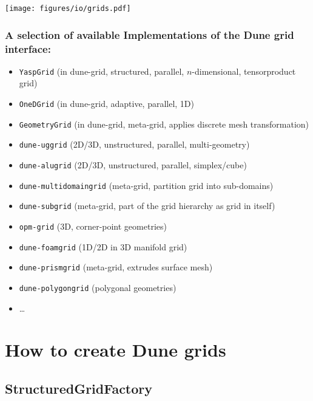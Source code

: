 \documentclass[ignorenonframetext,11pt]{beamer}
\theoremstyle{definition}
\begin{document}
\begin{frame}
 \texttt{[image: figures/io/grids.pdf]}
\end{frame}


\begin{frame}
  \frametitle{A selection of available Implementations of the Dune grid interface:}
  \begin{itemize}
  \item \lstinline!YaspGrid! (in dune-grid, structured, parallel, $n$-dimensional, tensorproduct grid)
  \item \lstinline!OneDGrid! (in dune-grid, adaptive, parallel, 1D)
  \item \lstinline!GeometryGrid! (in dune-grid, meta-grid, applies discrete mesh transformation)
  \item \lstinline!dune-uggrid! (2D/3D, unstructured, parallel, multi-geometry)
  \item \lstinline!dune-alugrid! (2D/3D, unstructured, parallel, simplex/cube)
  \item \lstinline!dune-multidomaingrid! (meta-grid, partition grid into sub-domains)
  \item \lstinline!dune-subgrid! (meta-grid, part of the grid hierarchy as grid in itself)
  \item \lstinline!opm-grid! (3D, corner-point geometries)
  \item \lstinline!dune-foamgrid! (1D/2D in 3D manifold grid)
  \item \lstinline!dune-prismgrid! (meta-grid, extrudes surface mesh)
  \item \lstinline!dune-polygongrid! (polygonal geometries)
  \item \ldots{}
  \end{itemize}
\end{frame}

\section{How to create Dune grids}

\subsection{StructuredGridFactory}
\end{document}
